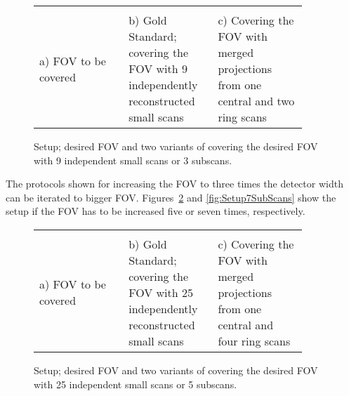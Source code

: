 \begin{figure}%
	\centering%
	\caption{Setup; desired FOV and two variants of covering the desired FOV with 9 independent small scans or 3 subscans.}%
	\begin{tabular}{p{0.3\linewidth}p{0.3\linewidth}p{0.3\linewidth}}
			 &%
		 &%
		\\%
		a) FOV to be covered &%
		b) Gold Standard; covering the FOV with 9 independently reconstructed small scans&%
		c) Covering the FOV with merged projections from one central and two ring scans\\%
	\end{tabular}%
	\label{fig:Setup3SubScans}%
\end{figure}%

The protocols shown for increasing the FOV to three times the detector width can be iterated to bigger FOV. Figures~\ref{fig:Setup5SubScans} and \ref{fig:Setup7SubScans} show the setup if the FOV has to be increased five or seven times, respectively.

\begin{figure}%
	\centering%
	\caption{Setup; desired FOV and two variants of covering the desired FOV with 25 independent small scans or 5 subscans.}%
	\begin{tabular}{p{0.3\linewidth}p{0.3\linewidth}p{0.3\linewidth}}%
		 &%
		 &%
		\\%
		a) FOV to be covered &%
		b) Gold Standard; covering the FOV with 25 independently reconstructed small scans &%
		c) Covering the FOV with merged projections from one central and four ring scans \\%
	\end{tabular}%
	\label{fig:Setup5SubScans}%
\end{figure}%

